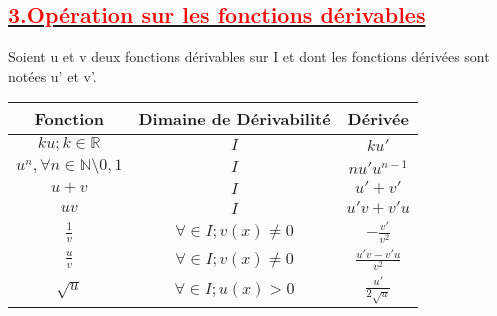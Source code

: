\documentclass[12pt]{article}
\begin{document}
\subsection*{\underline{\textbf{\textcolor{red}{3.Opération sur les fonctions dérivables}}}}
Soient u et v deux fonctions dérivables sur I et dont les fonctions dérivées sont notées u' et v'.
\begin{center}
\begin{tabular}{|c|c|c|}
\hline
Fonction &Dimaine de Dérivabilité &  Dérivée   \\
\hline
$ku;k\in \mathbb{R}$& $I$ & $ku'$ \\
\hline
$u^{n}, \forall n \in \mathbb{N}\setminus{0,1}$ & $I$ &$nu'u^{n-1}$\\
\hline
$u+v$& $I$ & $u'+v'$ \\
\hline
$uv$& $I$ & $u'v+v'u$ \\
\hline
$\frac{1}{v}$& $\forall \in I; v(x) \neq 0$ & $-\frac{v'}{v^{2}}$ \\
\hline
$\frac{u}{v}$& $\forall \in I; v(x) \neq 0$ & $\frac{u'v-v'u}{v^{2}}$ \\
\hline
$\sqrt{u}$& $\forall \in I; u(x) > 0$ & $\frac{u'}{2\sqrt{u}}$ \\
\hline
\end{tabular}
\end{center}
\end{document}
